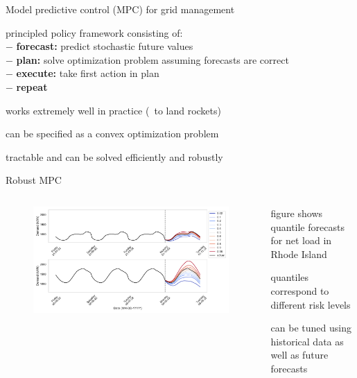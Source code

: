 \documentclass[aspectratio=169,11pt]{beamer}
\begin{document}
\begin{frame}{Model predictive control (MPC) for grid management}
\BIT
\item principled policy framework consisting of: \\
\hspace{12mm} $-$ \textbf{forecast:} predict stochastic future values \\
\hspace{12mm} $-$ \textbf{plan:} solve optimization problem assuming forecasts are correct \\
\hspace{12mm} $-$ \textbf{execute:} take first action in plan \\
\hspace{12mm} $-$ \textbf{repeat} 
\item works extremely well in practice (\eg \ to land rockets)
\item can be specified as a convex optimization problem
\item tractable and can be solved efficiently and robustly
\EIT
\end{frame}

\begin{frame}{Robust MPC}
\begin{columns}
	\begin{column}{0.65\textwidth}
		\begin{figure}
			\centering
			\includegraphics[width=\columnwidth]{./figures/marginal_quantile_forecasts.pdf}
		\end{figure}
	\end{column}
	\begin{column}{0.35\textwidth}
		\BIT
		\item figure shows quantile forecasts for net load in Rhode Island
		\item quantiles correspond to different risk levels
		\item can be tuned using historical data as well as future forecasts
		\EIT
	\end{column}
\end{columns}
\end{frame}
\end{document}

